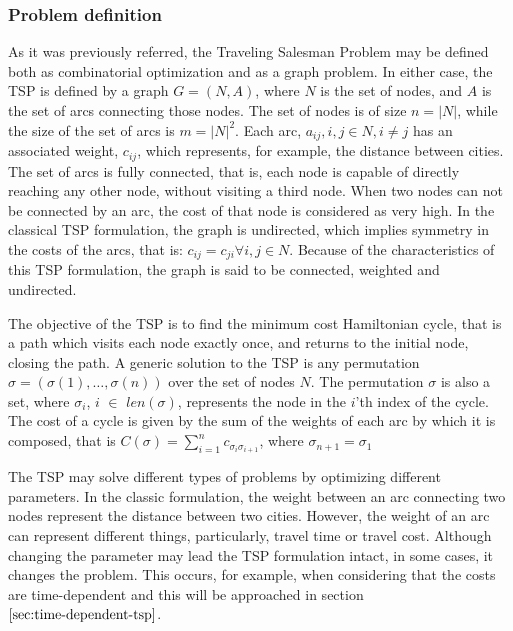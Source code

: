\subsubsection{Problem definition}
\label{sec:classic_tsp}

As it was previously referred, the Traveling Salesman Problem  may be defined both as combinatorial optimization and as a graph problem. In either case, the TSP is defined by a graph $G = (N, A)$, where $N$ is the set of nodes, and $A$ is the set of arcs connecting those nodes. The set of nodes is of size $n = |N|$, while the size of the set of arcs is $m = |N|^2$. Each arc, $a_{ij}, i, j \in N, i \ne j$ has an associated weight, $c_{ij}$, which represents, for example, the distance between cities. The set of arcs is fully connected, that is, each node is capable of directly reaching any other node, without visiting a third node. When two nodes can not be connected by an arc, the cost of that node is considered as very high. In the classical TSP formulation, the graph is undirected, which implies symmetry in the costs of the arcs, that is: $c_{ij} = c_{ji} \forall i, j \in N$. Because of the characteristics of this TSP formulation, the graph is said to be connected, weighted and undirected.

The objective of the TSP is to find the minimum cost Hamiltonian cycle, that is a path which visits each node exactly once, and returns to the initial node, closing the path. A generic solution to the TSP is any permutation $\sigma = (\sigma(1), \dots, \sigma(n))$ over the set of nodes $N$. The permutation $\sigma$ is also a set, where $\sigma_{i}$, $i$ $\in$ $len(\sigma)$, represents the node in the $i$'th index of the cycle. The cost of a cycle is given by the sum of the weights of each arc by which it is composed, that is $C(\sigma) = \sum_{i=1}^{n} c_{\sigma_{i} \sigma_{i+1}}$, where $\sigma_{n+1} = \sigma_{1}$

The TSP may solve different types of problems by optimizing different parameters. In the classic formulation, the weight between an arc connecting two nodes represent the distance between two cities. However, the weight of an arc can represent different things, particularly, travel time or travel cost. Although changing the parameter may lead the TSP formulation intact, in some cases, it changes the problem. This occurs, for example, when considering that the costs are time-dependent and this will be approached in section $\ref{sec:time-dependent-tsp}$.

